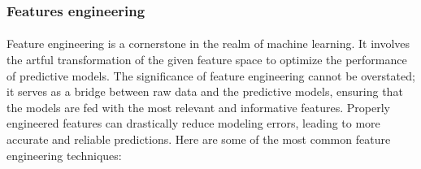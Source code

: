    \subsubsection{Features engineering}
        \paragraph{}Feature engineering\cite{khurana_feature_2017} is a cornerstone in the realm of machine learning. It involves the artful transformation of the given feature space to optimize the performance of predictive models. The significance of feature engineering cannot be overstated; it serves as a bridge between raw data and the predictive models, ensuring that the models are fed with the most relevant and informative features. Properly engineered features can drastically reduce modeling errors, leading to more accurate and reliable predictions. Here are some of the most common feature engineering techniques:

